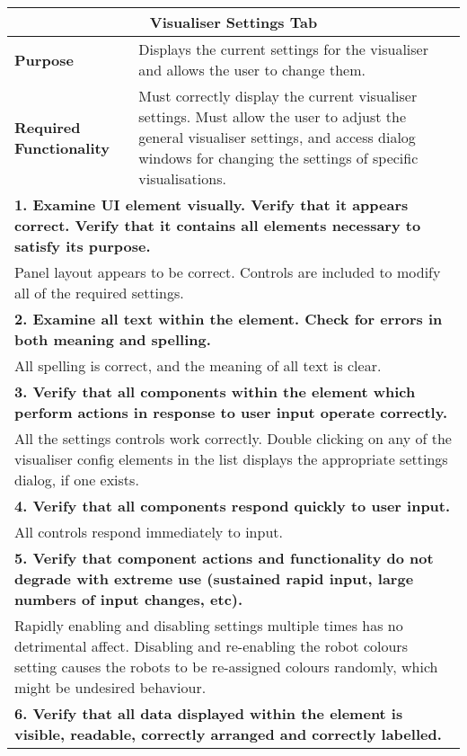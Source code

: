 \begin{longtable}{ l p{10cm} }
 \hline
 \multicolumn{2}{c}{\textbf{Visualiser Settings Tab}}\\
 \hline
 \textbf{Purpose} & Displays the current settings for the visualiser and allows the user to change them.\\
 \textbf{Required Functionality} & Must correctly display the current visualiser settings. Must allow the user to adjust the general visualiser settings, and access dialog windows for changing the settings of specific visualisations.\\
 \hline
 \multicolumn{2}{p{14cm}}{\textbf{1. Examine UI element visually. Verify that it appears correct. Verify that it contains all elements necessary to satisfy its purpose.}}\\
 \multicolumn{2}{p{14cm}}{Panel layout appears to be correct. Controls are included to modify all of the required settings.}\\
 \hline
 \multicolumn{2}{p{14cm}}{\textbf{2. Examine all text within the element. Check for errors in both meaning and spelling.}}\\
 \multicolumn{2}{p{14cm}}{All spelling is correct, and the meaning of all text is clear.}\\
 \hline
 \multicolumn{2}{p{14cm}}{\textbf{3. Verify that all components within the element which perform actions in response to user input operate correctly.}}\\
 \multicolumn{2}{p{14cm}}{All the settings controls work correctly. Double clicking on any of the visualiser config elements in the list displays the appropriate settings dialog, if one exists.}\\
 \hline
 \multicolumn{2}{p{14cm}}{\textbf{4. Verify that all components respond quickly to user input.}}\\
 \multicolumn{2}{p{14cm}}{All controls respond immediately to input.}\\
 \hline
 \multicolumn{2}{p{14cm}}{\textbf{5. Verify that component actions and functionality do not degrade with extreme use (sustained rapid input, large numbers of input changes, etc).}}\\
 \multicolumn{2}{p{14cm}}{Rapidly enabling and disabling settings multiple times has no detrimental affect. Disabling and re-enabling the robot colours setting causes the robots to be re-assigned colours randomly, which might be undesired behaviour.}\\
 \hline
 \multicolumn{2}{p{14cm}}{\textbf{6. Verify that all data displayed within the element is visible, readable, correctly arranged and correctly labelled.}}\\

\end{longtable}
